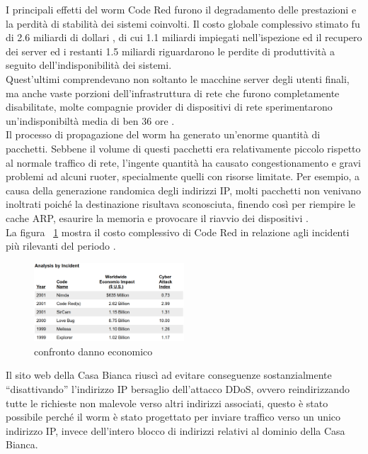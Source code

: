 I principali effetti del worm Code Red furono il degradamento delle prestazioni e la perdità di stabilità dei sistemi coinvolti. Il costo globale complessivo stimato fu di 2.6 miliardi di dollari \cite{ce, sans}, di cui 1.1 miliardi impiegati nell’ispezione ed il recupero dei server ed i restanti 1.5 miliardi riguardarono le perdite di produttività a seguito dell’indisponibilità dei sistemi.\\
Quest’ultimi comprendevano non soltanto le macchine server degli utenti finali, ma anche vaste porzioni dell’infrastruttura di rete che furono completamente disabilitate, molte compagnie provider di dispositivi di rete sperimentarono un’indisponibiltà media di ben 36 ore \cite{sans}.\\
Il processo di propagazione del worm ha generato un’enorme quantità di pacchetti. Sebbene il volume di questi pacchetti era relativamente piccolo rispetto al normale traffico di rete, l’ingente quantità ha causato congestionamento e gravi problemi ad alcuni ruoter, specialmente quelli con risorse limitate. Per esempio, a causa della generazione randomica degli indirizzi IP, molti pacchetti non venivano inoltrati poiché la destinazione risultava sconosciuta, finendo così per riempire le cache ARP, esaurire la memoria e provocare il riavvio dei dispositivi \cite{cisco}.\\
La figura ~\ref{impatto} mostra il costo complessivo di Code Red in relazione agli incidenti più rilevanti del periodo \cite{ce}.

\begin{figure}[!hbp]
\centering
\includegraphics[width=0.5\textwidth]{images/impatto.eps}
\caption{confronto danno economico}
\label{impatto}
\end{figure}

Il sito web della Casa Bianca riuscì ad evitare conseguenze sostanzialmente “disattivando” l’indirizzo IP bersaglio dell’attacco DDoS, ovvero reindirizzando tutte le richieste non malevole verso altri indirizzi associati, questo è stato possibile perché il worm è stato progettato per inviare traffico verso un unico indirizzo IP, invece dell’intero blocco di indirizzi relativi al dominio della Casa Bianca.

